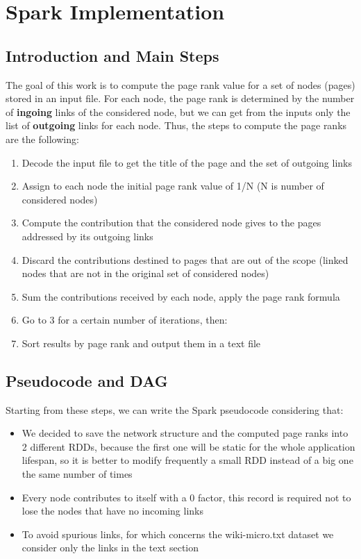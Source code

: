 \section{Spark Implementation}

\subsection{Introduction and Main Steps}
The goal of this work is to compute the page rank value for a set of nodes (pages) stored in an input file. For each node, the page rank is determined by the number of \textbf{ingoing} links of the considered node, but we can get from the inputs only the list of \textbf{outgoing} links for each node. Thus, the steps to compute the page ranks are the following:

\begin{enumerate}
	\item Decode the input file to get the title of the page and the set of outgoing links
	\item Assign to each node the initial page rank value of 1/N (N is number of considered nodes)
	\item Compute the contribution that the considered node gives to the pages addressed by its outgoing links
	\item Discard the contributions destined to pages that are out of the scope (linked nodes that are not in the original set of considered nodes)
	\item Sum the contributions received by each node, apply the page rank formula
	\item Go to 3 for a certain number of iterations, then:
	\item Sort results by page rank and output them in a text file
\end{enumerate}

\subsection{Pseudocode and DAG}
Starting from these steps, we can write the Spark pseudocode considering that:

\begin{itemize}
	\item We decided to save the network structure and the computed page ranks into 2 different RDDs, because the first one will be static for the whole application lifespan, so it is better to modify frequently a small RDD instead of a big one the same number of times
	\item Every node contributes to itself with a 0 factor, this record is required not to lose the nodes that have no incoming links
	\item To avoid spurious links, for which concerns the wiki-micro.txt dataset we consider only the links in the text section  
\end{itemize}

